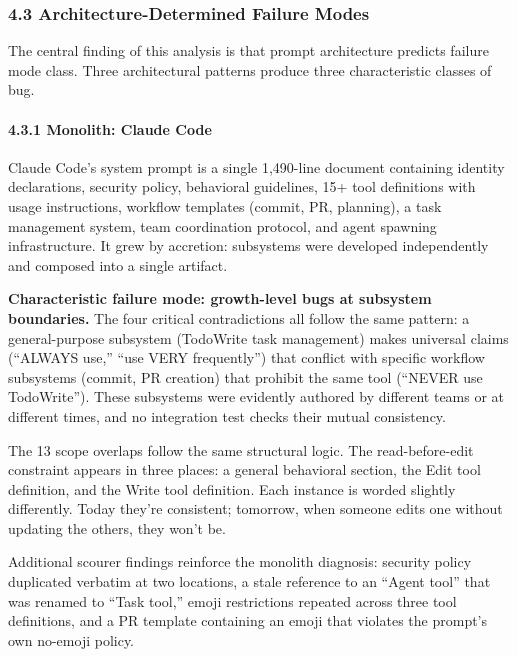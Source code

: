 \documentclass[
]{article}
\begin{document}
\hypertarget{architecture-determined-failure-modes}{%
\subsubsection{4.3 Architecture-Determined Failure
Modes}\label{architecture-determined-failure-modes}}

The central finding of this analysis is that prompt architecture
predicts failure mode class. Three architectural patterns produce three
characteristic classes of bug.

\hypertarget{monolith-claude-code}{%
\paragraph{4.3.1 Monolith: Claude Code}\label{monolith-claude-code}}

Claude Code's system prompt is a single 1,490-line document containing
identity declarations, security policy, behavioral guidelines, 15+ tool
definitions with usage instructions, workflow templates (commit, PR,
planning), a task management system, team coordination protocol, and
agent spawning infrastructure. It grew by accretion: subsystems were
developed independently and composed into a single artifact.

\textbf{Characteristic failure mode: growth-level bugs at subsystem
boundaries.} The four critical contradictions all follow the same
pattern: a general-purpose subsystem (TodoWrite task management) makes
universal claims (``ALWAYS use,'' ``use VERY frequently'') that conflict
with specific workflow subsystems (commit, PR creation) that prohibit
the same tool (``NEVER use TodoWrite''). These subsystems were evidently
authored by different teams or at different times, and no integration
test checks their mutual consistency.

The 13 scope overlaps follow the same structural logic. The
read-before-edit constraint appears in three places: a general
behavioral section, the Edit tool definition, and the Write tool
definition. Each instance is worded slightly differently. Today they're
consistent; tomorrow, when someone edits one without updating the
others, they won't be.

Additional scourer findings reinforce the monolith diagnosis: security
policy duplicated verbatim at two locations, a stale reference to an
``Agent tool'' that was renamed to ``Task tool,'' emoji restrictions
repeated across three tool definitions, and a PR template containing an
emoji that violates the prompt's own no-emoji policy.
\end{document}
